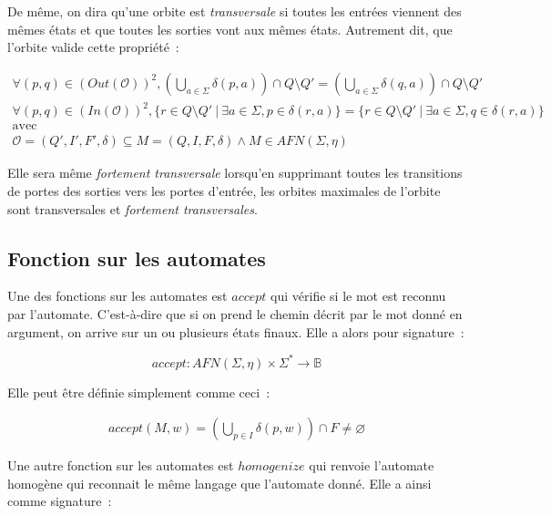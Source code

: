 \begin{definition}
    De même, on dira qu'une orbite est \textit{transversale} si toutes les
    entrées viennent des mêmes états et que toutes les sorties vont aux mêmes
    états. Autrement dit, que l'orbite valide cette propriété~:

    \begin{gather*}
        \forall (p, q) \in (Out(\mathcal{O}))^2, (\bigcup_{a \in \Sigma} \delta(p, a)) \cap Q \setminus Q' = (\bigcup_{a \in \Sigma} \delta(q, a)) \cap Q \setminus Q' \\
        \forall (p, q) \in (In(\mathcal{O}))^2, \{r \in Q \setminus Q' ~|~ \exists a \in \Sigma, p \in \delta(r, a)\} = \{r \in Q \setminus Q' ~|~ \exists a \in \Sigma, q \in \delta(r, a)\} \\
        \text{avec} \\
        \mathcal{O} = (Q', I', F', \delta) \subseteq M = (Q, I, F, \delta) \land M \in AFN(\Sigma, \eta)
    \end{gather*}

    \noindent Elle sera même \textit{fortement transversale} lorsqu'en
    supprimant toutes les transitions de portes des sorties vers les portes
    d'entrée, les orbites maximales de l'orbite sont transversales et
    \textit{fortement transversales}.
\end{definition}

\subsection{Fonction sur les automates}

Une des fonctions sur les automates est \(accept\) qui vérifie si le mot est
reconnu par l'automate. C'est-à-dire que si on prend le chemin décrit par le
mot donné en argument, on arrive sur un ou plusieurs états finaux. Elle a alors
pour signature~:

\[
    accept: AFN(\Sigma, \eta) \times \Sigma^* \to \mathbb{B}
\]

Elle peut être définie simplement comme ceci~:

\begin{align*}
    accept(M, w) = (\bigcup_{p \in I} \delta(p, w)) \cap F \neq \varnothing
\end{align*}

Une autre fonction sur les automates est \(homogenize\) qui renvoie l'automate
homogène qui reconnait le même langage que l'automate donné. Elle a ainsi comme
signature~:

